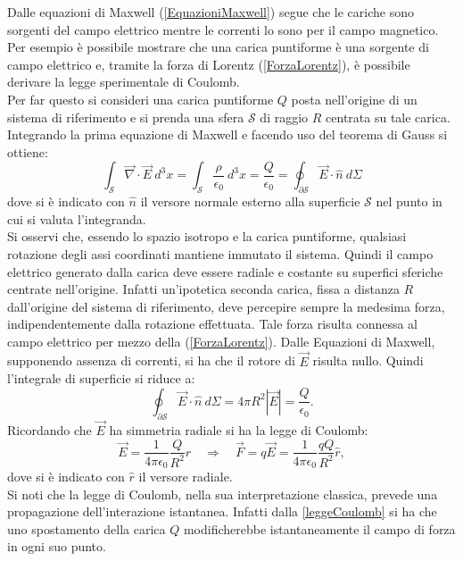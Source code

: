 Dalle equazioni di Maxwell (\ref{EquazioniMaxwell}) segue che le cariche sono sorgenti del campo 
elettrico mentre le correnti lo sono per 
il campo magnetico. Per esempio è possibile mostrare che una carica puntiforme è una sorgente di campo elettrico e, 
tramite la forza di Lorentz (\ref{ForzaLorentz}), è possibile derivare la legge sperimentale di Coulomb.\\
Per far questo si consideri una carica puntiforme $Q$ posta nell'origine di un sistema di riferimento e si prenda una sfera $\mathcal{S}$ di raggio $R$ 
centrata su tale carica. Integrando la prima equazione di Maxwell e facendo uso del teorema di Gauss si ottiene:
\begin{equation*}
	\int_\mathcal{S}\vec{\nabla}\cdot\vec{E}\ d^3x=\int_\mathcal{S}\frac{\rho}{\epsilon_0}\ d^3x=\frac{Q}{\epsilon_0}=\oint_{\partial\mathcal{S}}\vec{E}\cdot\hat{n}\ d\Sigma
\end{equation*}
dove si è indicato con $\hat{n}$ il versore normale esterno alla superficie $\mathcal{S}$ nel punto in cui si valuta l'integranda.\\
Si osservi che, essendo lo spazio 
isotropo e la carica puntiforme, qualsiasi rotazione degli assi coordinati mantiene immutato il sistema. Quindi
il campo elettrico generato dalla carica deve essere radiale e costante su superfici sferiche centrate nell'origine. Infatti un'ipotetica seconda carica, 
fissa a distanza $R$ dall'origine del sistema di riferimento, deve percepire sempre la medesima forza, indipendentemente dalla rotazione effettuata.
Tale forza risulta connessa al campo elettrico per mezzo della (\ref{ForzaLorentz}). Dalle Equazioni di Maxwell, supponendo assenza di correnti, 
si ha che il rotore di $\vec{E}$ risulta nullo. Quindi l'integrale di superficie si riduce a:
\begin{equation*}
	\oint_{\partial\mathcal{S}}\vec{E}\cdot\hat{n}\ d\Sigma=4\pi R^2|\vec{E}|=\frac{Q}{\epsilon_0}.
\end{equation*}	
Ricordando che $\vec{E}$ ha simmetria radiale si ha la legge di Coulomb:
\begin{equation}
	\vec{E}=\frac{1}{4\pi\epsilon_0}\frac{Q}{R^2}\hat{r} \quad \Rightarrow \quad \vec{F}=q\vec{E}=\frac{1}{4\pi\epsilon_0}\frac{qQ}{R^2}\hat{r},\label{leggeCoulomb}
\end{equation} 
dove si è indicato con $\hat{r}$ il versore radiale.\\
Si noti che la legge di Coulomb, nella sua interpretazione classica, prevede una propagazione dell'interazione istantanea. Infatti dalla \eqref{leggeCoulomb} si ha che uno spostamento della carica $Q$ modificherebbe istantaneamente il campo di forza in ogni suo punto.\\

